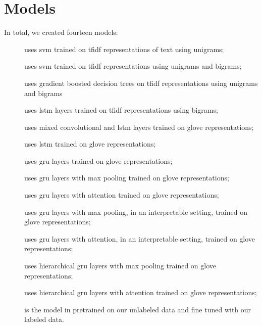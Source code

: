 \section{Models}\label{sec:models}
In total, we created fourteen models:
\begin{description}
\item[\svm] uses \ac{svm} trained on \ac{tfidf} representations of text
  using unigrams;
\item[\svmb] uses \ac{svm} trained on \ac{tfidf} representations
  using unigrams and bigrams;
\item[\xgb] uses gradient boosted decision trees
  \cite{chen2016xgboost} on \ac{tfidf} representations
  using unigrams and bigrams
\item[\lstmng] uses \ac{lstm} layers trained on \ac{tfidf}
  representations using bigrams;
\item[\lstmc] uses mixed convolutional and \ac{lstm} layers trained on
  \ac{glove} representations;
\item[\lstmb] uses \ac{lstm} trained on \ac{glove} representations;
\item[\gru] uses \ac{gru} layers trained on \ac{glove} representations;
\item[\maxp] uses \ac{gru} layers with max pooling trained on \ac{glove}
  representations;
\item[\softmax] uses \ac{gru} layers with attention trained on \ac{glove}
  representations;
\item[\maxi] uses \ac{gru} layers with max pooling, in an interpretable setting, trained on \ac{glove}
  representations;
\item[\softmaxi] uses \ac{gru} layers with attention, in an interpretable setting, trained on \ac{glove}
  representations;
\item[\maxh] uses hierarchical \ac{gru} layers with max pooling trained on \ac{glove}
  representations;
\item[\softmaxh] uses hierarchical \ac{gru} layers with attention trained on \ac{glove}
  representations;
\item[\bert] is the model in \cite{devlin2018bert} pretrained
  on our unlabeled data and fine tuned with our labeled data.
\end{description}

